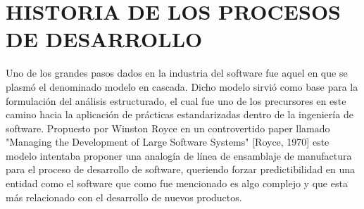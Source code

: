 \section{HISTORIA DE LOS PROCESOS DE DESARROLLO}
Uno de los grandes pasos dados en la industria del software fue aquel en que se
plasmó el denominado modelo en cascada. Dicho modelo sirvió como base para la
formulación del análisis estructurado, el cual fue uno de los precursores en este camino
hacia la aplicación de prácticas estandarizadas dentro de la ingeniería de software.
Propuesto por Winston Royce en un controvertido paper llamado "Managing the
Development of Large Software Systems" [Royce, 1970] este modelo intentaba
proponer una analogía de línea de ensamblaje de manufactura para el proceso de desarrollo de software, queriendo forzar predictibilidad en una entidad como el software
que como fue mencionado es algo complejo y que esta más relacionado con el
desarrollo de nuevos productos.